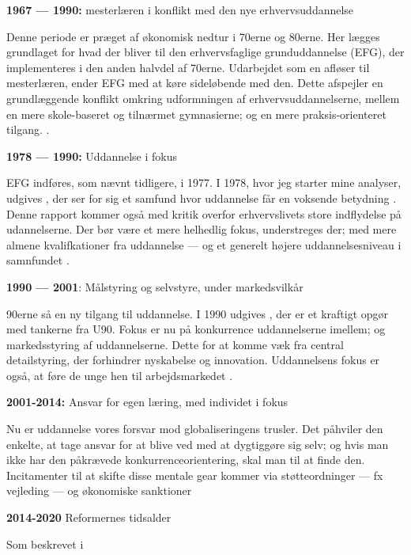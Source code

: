 \textbf{1967 — 1990:} mesterlæren i konflikt med den nye erhvervsuddannelse

Denne periode er præget af økonomisk nedtur i 70erne og 80erne.
Her lægges grundlaget for hvad der bliver til den erhvervsfaglige grunduddannelse (EFG), der implementeres i den anden halvdel af 70erne.
Udarbejdet som en afløser til mesterlæren, ender EFG med at køre sideløbende med den.
Dette afspejler en grundlæggende konflikt omkring udformningen af erhvervsuddannelserne, mellem en mere skole-baseret og tilnærmet gymnasierne; og en mere praksis-orienteret tilgang.
\autocite[s. 49ff, 57]{bondergaardHistoricalEmergenceKey2014}.

\textbf{1978 — 1990:} Uddannelse i fokus

EFG indføres, som nævnt tidligere, i 1977. I 1978, hvor jeg starter mine analyser, udgives , der ser for sig et samfund hvor uddannelse får en voksende betydning \autocite{undervisningsministeriet90SamletUddannelsesplanlaegning1978}.
Denne rapport kommer også med kritik overfor erhvervslivets store indflydelse på udannelserne.
Der bør være et mere helhedlig fokus, understreges der; med mere almene kvalifkationer fra uddannelse — og et generelt højere uddannelsesniveau i samnfundet \autocite[s 18f]{juulDiskurserOmUngdom2013}.

\textbf{1990 — 2001}: Målstyring og selvstyre, under markedsvilkår

90erne så en ny tilgang til uddannelse.
I 1990 udgives , der er et kraftigt opgør med tankerne fra U90.
Fokus er nu på konkurrence uddannelserne imellem; og markedsstyring af uddannelserne.
Dette for at komme væk fra central detailstyring, der forhindrer nyskabelse og innovation.
Uddannelsens fokus er også, at føre de unge hen til arbejdsmarkedet \autocite[s. 19]{juulDiskurserOmUngdom2013}.

\textbf{2001-2014:} Ansvar for egen læring, med individet i fokus

Nu er uddannelse vores forsvar mod globaliseringens trusler.
Det påhviler den enkelte, at tage ansvar for at blive ved med at dygtiggøre sig selv; og hvis man ikke har den påkrævede konkurrenceorientering, skal man til at finde den.
Incitamenter til at skifte disse mentale gear kommer via støtteordninger — fx vejleding — og økonomiske sanktioner

\textbf{2014-2020} Reformernes tidsalder

Som beskrevet i 

